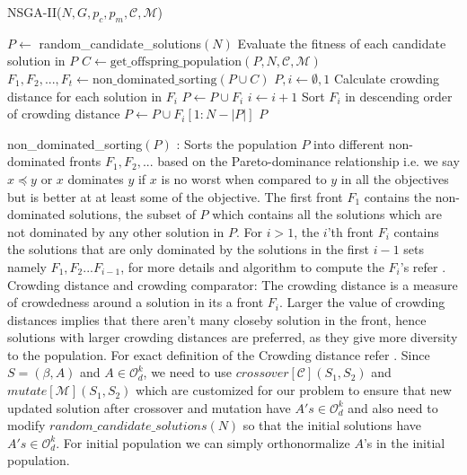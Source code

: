 \begin{algorithm}[H] \label{nsga2_psoudocode}
\caption{NSGA-II($N,G,p_c,p_m,\mathcal{C},\mathcal{M}$)}
\begin{algorithmic}[1]
\State $P \gets$ random\_candidate\_solutions$(N)$ 
\State Evaluate the fitness of each candidate solution in $P$ 
\State $C \gets \text{get\_offspring\_population}(P,N, \mathcal{C}, \mathcal{M})$
\State $F_1, F_2,..., F_t \gets \text{non\_dominated\_sorting}(P \cup C)$ 
\State $P , i \gets \emptyset, 1 $
\State Calculate crowding distance for each solution in $F_i$
\State $P \gets P \cup F_i$
\State $i \gets i+1$
\EndWhile
{}
\State Sort $F_i$ in descending order of crowding distance
\State $P \gets P \cup F_i[1:N-|P|]$ 
\EndIf 
\EndFor 
\State \Return $P$
\end{algorithmic}
\end{algorithm}
\newline non\_dominated\_sorting$(P)$ : Sorts the population $P$ into different non-dominated fronts $F_1,F_2,...$ based on the Pareto-dominance relationship i.e. we say $x \preceq y$ or $x$ dominates $y$ if $x$ is no worst when compared to $y$ in all the objectives but is better at at least some of the objective. The first front $F_1$ contains the non-dominated solutions, the subset of $P$ which contains all the solutions which are not dominated by any other solution in $P$. For $i>1$, the $i$'th front $F_i$ contains the solutions that are only dominated by the solutions in the first $i-1$ sets namely $F_1,F_2...F_{i-1}$, for more details and algorithm to compute the $F_i$'s refer \cite{deb2002fast}.
\newline \newline  Crowding distance and crowding comparator: The crowding distance is a measure of crowdedness around a solution in its a front $F_i$. Larger the value of crowding distances implies that there aren't many closeby solution in the front, hence solutions with larger crowding distances are preferred, as they give more diversity to the population. For exact definition of the Crowding distance refer \cite{deb2002fast}.
\newline Since $S = (\beta,A)$ and $A \in \mathcal{O}^{k}_{d}$, we need to use $crossover[\mathcal{C}](S_1,S_2)$ and $mutate[\mathcal{M}](S_1,S_2)$ which are  customized for our problem to ensure that new updated solution after crossover and mutation have $A's \in \mathcal{O}^{k}_{d}$ and also need to modify $random\_candidate\_solutions(N)$ so that the initial solutions have $A's \in \mathcal{O}^{k}_{d}$. For initial population we can simply orthonormalize $A$'s in the initial population.


